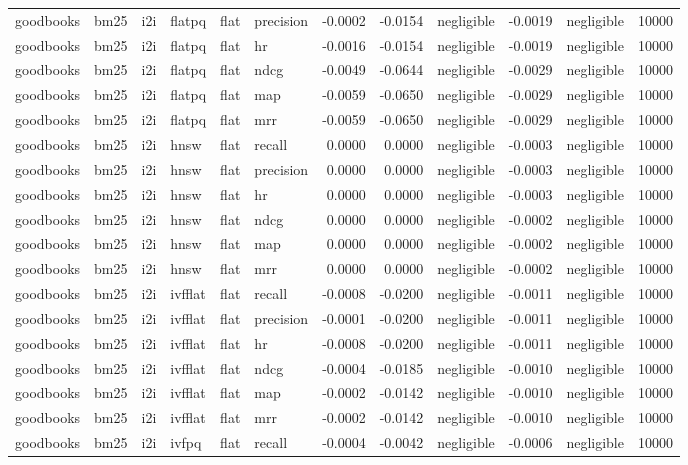 \begin{tabular}{llllllrrlrlr}
goodbooks & bm25 & i2i & flatpq & flat & precision & -0.0002 & -0.0154 & negligible & -0.0019 & negligible & 10000 \\
goodbooks & bm25 & i2i & flatpq & flat & hr & -0.0016 & -0.0154 & negligible & -0.0019 & negligible & 10000 \\
goodbooks & bm25 & i2i & flatpq & flat & ndcg & -0.0049 & -0.0644 & negligible & -0.0029 & negligible & 10000 \\
goodbooks & bm25 & i2i & flatpq & flat & map & -0.0059 & -0.0650 & negligible & -0.0029 & negligible & 10000 \\
goodbooks & bm25 & i2i & flatpq & flat & mrr & -0.0059 & -0.0650 & negligible & -0.0029 & negligible & 10000 \\
goodbooks & bm25 & i2i & hnsw & flat & recall & 0.0000 & 0.0000 & negligible & -0.0003 & negligible & 10000 \\
goodbooks & bm25 & i2i & hnsw & flat & precision & 0.0000 & 0.0000 & negligible & -0.0003 & negligible & 10000 \\
goodbooks & bm25 & i2i & hnsw & flat & hr & 0.0000 & 0.0000 & negligible & -0.0003 & negligible & 10000 \\
goodbooks & bm25 & i2i & hnsw & flat & ndcg & 0.0000 & 0.0000 & negligible & -0.0002 & negligible & 10000 \\
goodbooks & bm25 & i2i & hnsw & flat & map & 0.0000 & 0.0000 & negligible & -0.0002 & negligible & 10000 \\
goodbooks & bm25 & i2i & hnsw & flat & mrr & 0.0000 & 0.0000 & negligible & -0.0002 & negligible & 10000 \\
goodbooks & bm25 & i2i & ivfflat & flat & recall & -0.0008 & -0.0200 & negligible & -0.0011 & negligible & 10000 \\
goodbooks & bm25 & i2i & ivfflat & flat & precision & -0.0001 & -0.0200 & negligible & -0.0011 & negligible & 10000 \\
goodbooks & bm25 & i2i & ivfflat & flat & hr & -0.0008 & -0.0200 & negligible & -0.0011 & negligible & 10000 \\
goodbooks & bm25 & i2i & ivfflat & flat & ndcg & -0.0004 & -0.0185 & negligible & -0.0010 & negligible & 10000 \\
goodbooks & bm25 & i2i & ivfflat & flat & map & -0.0002 & -0.0142 & negligible & -0.0010 & negligible & 10000 \\
goodbooks & bm25 & i2i & ivfflat & flat & mrr & -0.0002 & -0.0142 & negligible & -0.0010 & negligible & 10000 \\
goodbooks & bm25 & i2i & ivfpq & flat & recall & -0.0004 & -0.0042 & negligible & -0.0006 & negligible & 10000 \\

\end{tabular}

